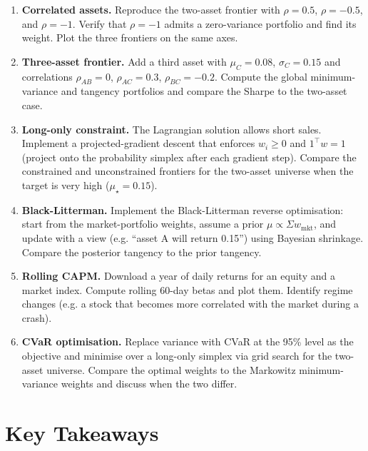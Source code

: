 \begin{enumerate}
    \item \textbf{Correlated assets.} Reproduce the two-asset frontier with
      $\rho = 0.5$, $\rho = -0.5$, and $\rho = -1$. Verify that $\rho = -1$
      admits a zero-variance portfolio and find its weight. Plot the
      three frontiers on the same axes.

    \item \textbf{Three-asset frontier.} Add a third asset with
      $\mu_C = 0.08$, $\sigma_C = 0.15$ and correlations $\rho_{AB} = 0$,
      $\rho_{AC} = 0.3$, $\rho_{BC} = -0.2$. Compute the global
      minimum-variance and tangency portfolios and compare the Sharpe to
      the two-asset case.

    \item \textbf{Long-only constraint.} The Lagrangian solution allows
      short sales. Implement a projected-gradient descent that enforces
      $w_i \ge 0$ and $1^\top w = 1$ (project onto the probability simplex
      after each gradient step). Compare the constrained and unconstrained
      frontiers for the two-asset universe when the target is very high
      ($\mu_\star = 0.15$).

    \item \textbf{Black-Litterman.} Implement the Black-Litterman reverse
      optimisation: start from the market-portfolio weights, assume a
      prior $\mu \propto \Sigma w_{\text{mkt}}$, and update with a view
      (e.g. ``asset A will return 0.15'') using Bayesian shrinkage.
      Compare the posterior tangency to the prior tangency.

    \item \textbf{Rolling CAPM.} Download a year of daily returns for an
      equity and a market index. Compute rolling 60-day betas and plot
      them. Identify regime changes (e.g. a stock that becomes more
      correlated with the market during a crash).

    \item \textbf{CVaR optimisation.} Replace variance with CVaR at the
      95\% level as the objective and minimise over a long-only simplex
      via grid search for the two-asset universe. Compare the optimal
      weights to the Markowitz minimum-variance weights and discuss when
      the two differ.
\end{enumerate}

\section{Key Takeaways}

